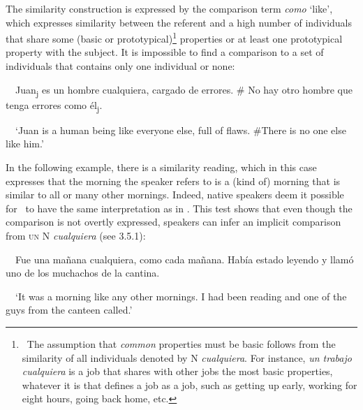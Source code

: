 \begin{styleStandard}
The similarity construction is expressed by the comparison term \textit{como} ‘like’, which expresses similarity between the referent and a high number of individuals that share some (basic or prototypical)\footnote{\textrm{\ The assumption that }\textrm{\textit{common}}\textrm{ properties must be basic follows from the similarity of all individuals denoted by N }\textrm{\textit{cualquiera}}\textrm{. For instance, }\textrm{\textit{un trabajo cualquiera}}\textrm{ is a job that shares with other jobs the most basic properties, whatever it is that defines a job as a job, such as getting up early, working for eight hours, going back home, etc.}} properties or at least one prototypical property with the subject. It is impossible to find a comparison to a set of individuals that contains only one individual or none:
\end{styleStandard}

\begin{styleStandard}
\ \ Juan\textsubscript{j} es un hombre cualquiera, cargado de errores. \# No hay otro hombre que tenga errores como él\textsubscript{j}.
\end{styleStandard}

\begin{styleStandard}
\ \ ‘Juan is a human being like everyone else, full of flaws. \#There is no one else like him.’
\end{styleStandard}

\begin{styleStandard}
In the following example, there is a similarity reading, which in this case expresses that the morning the speaker refers to is a (kind of) morning that is similar to all or many other mornings. Indeed, native speakers deem it possible for \ to have the same interpretation as in . This test shows that even though the comparison is not overtly expressed, speakers can infer an implicit comparison from \textsc{un} N \textit{cualquiera} (see 3.5.1):
\end{styleStandard}

\begin{styleStandard}
\label{bkm:Ref42870625}\ \ Fue una mañana cualquiera, como cada mañana. Había estado leyendo y llamó uno de los muchachos de la cantina.
\end{styleStandard}

\begin{styleStandard}
\ \ ‘It was a morning like any other mornings. I had been reading and one of the guys from the canteen called.’
\end{styleStandard}

